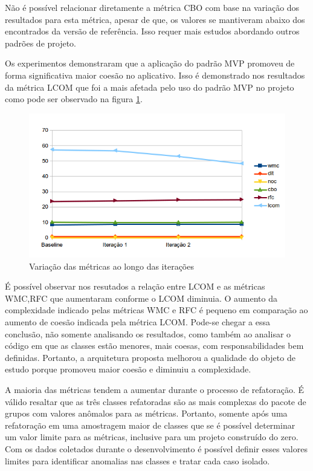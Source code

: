 Não é possível relacionar diretamente a métrica CBO com base na
variação dos resultados para esta métrica, apesar de que, os valores se
mantiveram abaixo dos encontrados da versão de referência.
Isso requer mais estudos abordando outros padrões de projeto. 

Os experimentos demonstraram que a aplicação do padrão MVP promoveu de forma
significativa maior coesão no aplicativo. Isso é demonstrado nos resultados da
métrica LCOM que foi a mais afetada pelo uso do padrão MVP no projeto como pode
ser observado na figura \ref{fig:allmetrics}.

\begin{figure}[htb]
	\label{fig:allmetrics}
	\caption{Variação das métricas ao longo das iterações}
	\begin{center}
		\includegraphics{img/allmetrics}
	\end{center}
\end{figure}


É possível observar nos resutados a relação entre LCOM e as métricas 
WMC,RFC que aumentaram conforme o LCOM diminuia. O aumento da complexidade
indicado pelas métricas WMC e RFC é pequeno em comparação ao aumento de
coesão indicada pela métrica LCOM. Pode-se chegar a essa conclusão, não somente
analisando os resultados, como também ao analisar o código em que as classes
estão menores, mais coesas, com responsabilidades bem definidas. Portanto, a
arquitetura proposta melhorou a qualidade do objeto de estudo porque promoveu
maior coesão e diminuiu a complexidade.

A maioria das métricas tendem a aumentar durante o processo de refatoração. 
É válido resaltar que as três classes refatoradas são as mais complexas do
pacote de grupos com valores anômalos para as métricas. Portanto, somente após
uma refatoração em uma amostragem maior de classes que se é possível determinar
um valor limite para as métricas, inclusive para um projeto construído do zero.
Com os dados coletados durante o desenvolvimento é possível definir
esses valores limites para identificar anomalias nas classes e tratar cada caso
isolado.

